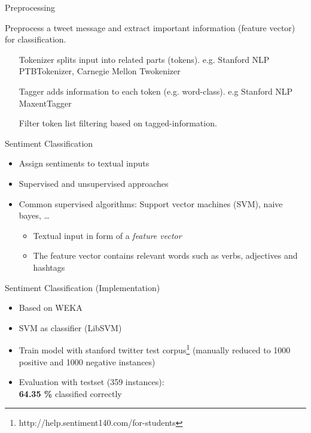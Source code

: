 \documentclass{beamer}
\begin{document}
\begin{frame}{Preprocessing}
\begin{block}{}
Preprocess a tweet message and extract important information (feature vector) for classification.
\end{block}
\begin{itemize}
	\item[Tokenizer]
    splits input into related parts (tokens). e.g. Stanford NLP PTBTokenizer, Carnegie Mellon Twokenizer
	\item[Tagger]
    adds information to each token (e.g. word-class).  e.g Stanford NLP MaxentTagger
	\item[Filter token list] 
    filtering based on tagged-information. 
\end{itemize}


\end{frame}

\begin{frame}{Sentiment Classification}
\begin{itemize}
	\item Assign sentiments to textual inputs
    \item Supervised and unsupervised approaches
    \item Common supervised algorithms: Support vector machines (SVM), naive bayes, \ldots
    \begin{itemize}
        \item Textual input in form of a \emph{feature vector}
        \item The feature vector contains relevant words such as verbs, adjectives and hashtags
    \end{itemize}
\end{itemize}
\end{frame}


\begin{frame}{Sentiment Classification (Implementation)}
\begin{itemize}
	\item Based on WEKA
    \item SVM as classifier (LibSVM)
    \item Train model with stanford twitter test corpus\footnote{\tiny{http://help.sentiment140.com/for-students}} (manually reduced to 1000 positive and 1000 negative instances)
	\item Evaluation with testset (359 instances):\\ \textbf{64.35 \%} classified correctly
\end{itemize}
\end{frame}
\end{document}
